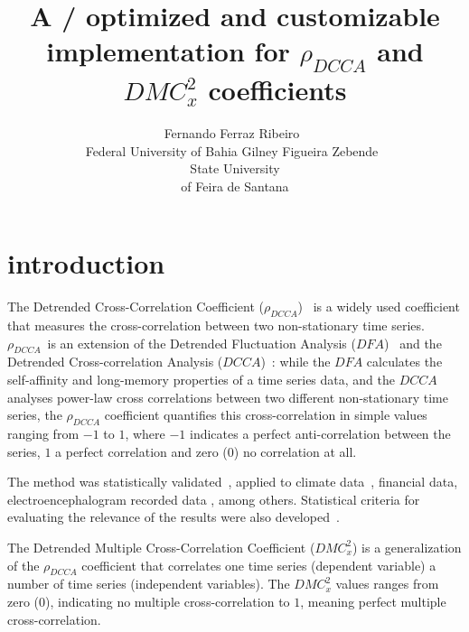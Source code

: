 \documentclass[nojss]{jss}
\author{Fernando Ferraz Ribeiro~\orcidlink{0000-0002-0685-4774}\\Federal University of Bahia
   \And Gilney Figueira Zebende~\orcidlink{0000-0003-2420-9805}\\State University\\of Feira de Santana}
\title{A \proglang{Python}/\proglang{Zig} optimized and customizable implementation for $\rho_{DCCA}$ and $DMC_x^2$ coefficients}
\begin{document}


\section{introduction} \label{sec:intro}


The Detrended Cross-Correlation Coefficient ($\rho_{DCCA}$)~\citep{Zebende2011} is a widely used coefficient that measures the cross-correlation between two non-stationary time series. $\rho_{DCCA}$~is an extension of the Detrended Fluctuation Analysis ($DFA$)~\citep{Peng_1994} and the Detrended Cross-correlation Analysis ($DCCA$)~\citep{Podobnik2008}: while the $DFA$ calculates the self-affinity and long-memory properties of a time series data, and the $DCCA$ analyses power-law cross correlations between two different non-stationary time series, the $\rho_{DCCA}$ coefficient quantifies this cross-correlation in simple values ranging from $-1$ to $1$, where $-1$ indicates a perfect anti-correlation between the series, $1$ a perfect correlation and zero ($0$) no correlation at all.

The method was statistically validated~\citep{PhysRevE.84.066118}, applied to climate data~\cite{vassolerZebende2012}, financial data\citep{Wang2013, Guedes2017, Ferreira2018}, electroencephalogram recorded data \citep{Oliveira2023}, among others. Statistical criteria for evaluating the relevance of the results were also developed~\cite{Guedes2018,Guedes2018a}.

The Detrended Multiple Cross-Correlation Coefficient \citep{Zebende2018} ($DMC_x^2$) is a generalization of the $\rho_{DCCA}$ coefficient that correlates one time series (dependent variable) a number of time series (independent variables). The $DMC_x^2$ values ranges from zero ($0$), indicating no multiple cross-correlation to $1$, meaning perfect multiple cross-correlation.
\end{document}
